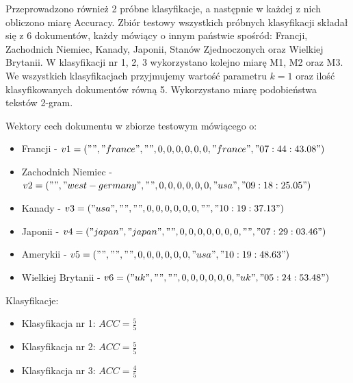 \documentclass{classrep}
\begin{document}
Przeprowadzono również 2 próbne klasyfikacje, a następnie w każdej z nich obliczono miarę Accuracy. 
Zbiór testowy wszystkich próbnych klasyfikacji składał się z 6 dokumentów, każdy mówiący o innym państwie spośród: Francji, Zachodnich Niemiec, Kanady, Japonii, Stanów Zjednoczonych oraz Wielkiej Brytanii.
W klasyfikacji nr 1, 2, 3 wykorzystano kolejno miarę M1, M2 oraz M3. We wszystkich klasyfikacjach przyjmujemy wartość parametru $k = 1$ oraz ilość klasyfikowanych dokumentów równą 5. Wykorzystano miarę podobieństwa tekstów 2-gram.

Wektory cech dokumentu w zbiorze testowym mówiącego o:
\begin{itemize}
\item Francji - $v1 = ("", "france", "", 0, 0, 0, 0, 0, 0, "france", "07:44:43.08")$
\item Zachodnich Niemiec - $v2 = ("", "west-germany", "", 0, 0, 0, 0, 0, 0, "usa", "09:18:25.05")$
\item Kanady - $v3 = ("usa", "", "", 0, 0, 0, 0, 0, 0, "", "10:19:37.13")$
\item Japonii - $v4 = ("japan", "japan", "", 0, 0, 0, 0, 0, 0, 0, "", "07:29:03.46")$
\item Amerykii - $v5 = ("", "", "", 0, 0, 0, 0, 0, 0, "usa", "10:19:48.63")$
\item Wielkiej Brytanii - $v6 = ("uk", "", "", 0, 0, 0, 0, 0, 0, "uk", "05:24:53.48")$ \\
\end{itemize} 

Klasyfikacje:
\begin{itemize}
\item Klasyfikacja nr 1:
$ACC = \frac{5}{5}$ \\
\item Klasyfikacja nr 2:
$ACC = \frac{5}{5}$\\
\item Klasyfikacja nr 3:
$ACC = \frac{4}{5}$
\end{itemize}

\end{document}
